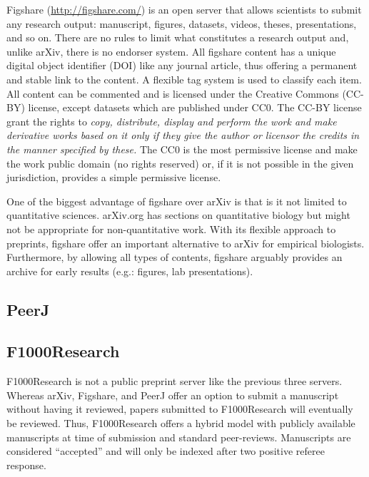 \documentclass[letterpaper,twocolumn,superscriptaddress,showkeys]{revtex4-1}
\begin{document}
Figshare (\href{http://figshare.com/}{http://figshare.com/}) is an open server
that allows scientists to submit any research output: manuscript, figures,
datasets, videos, theses, presentations, and so on. There are no rules to limit
what constitutes a research output and, unlike arXiv, there is no endorser
system. All figshare content has a unique digital object identifier (DOI) like
any journal article, thus offering a permanent and stable link to the content.
A flexible tag system is used to classify each item. All content can be
commented and is licensed under the Creative Commons (CC-BY) license, except
datasets which are published under CC0. The CC-BY license grant the rights to
\emph{copy, distribute, display and perform the work and make derivative works
based on it only if they give the author or licensor the credits in the manner
specified by these.} The CC0 is the most permissive license and make the work
public domain (no rights reserved) or, if it is not possible in the given
jurisdiction, provides a simple permissive license.

One of the biggest advantage of figshare over arXiv is that is it not limited to
quantitative sciences. arXiv.org has sections on quantitative biology but might
not be appropriate for non-quantitative work. With its flexible approach to
preprints, figshare offer an important alternative to arXiv for empirical
biologists. Furthermore, by allowing all types of contents, figshare arguably
provides an archive for early results (e.g.: figures, lab presentations).

\subsection{PeerJ}


\subsection{F1000Research}

F1000Research is not a public preprint server like the previous three servers.
Whereas arXiv, Figshare, and PeerJ offer an option to submit a manuscript
without having it reviewed, papers submitted to F1000Research will eventually be
reviewed. Thus, F1000Research offers a hybrid model with publicly available
manuscripts at time of submission and standard peer-reviews. Manuscripts are
considered ``accepted'' and will only be indexed after two positive referee
response.
\end{document}
